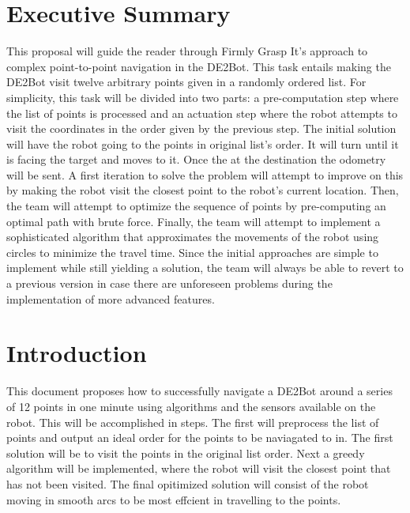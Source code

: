 \documentclass[12pt,conference,onecolumn]{IEEEtran} %
\begin{document}
\section{Executive Summary}
This proposal will guide the reader through Firmly Grasp It's approach to complex point-to-point navigation in the DE2Bot. This task entails making the DE2Bot visit twelve arbitrary points given in a randomly ordered list. For simplicity, this task will be divided into two parts: a pre-computation step where the list of points is processed and an actuation step where the robot attempts to visit the coordinates in the order given by the previous step. The initial solution will have the robot going to the points in original list's order. It will turn until it is facing the target and moves to it. Once the at the destination the odometry will be sent. A first iteration to solve the problem will attempt to improve on this by making the robot visit the closest point to the robot's current location. Then, the team will attempt to optimize the sequence of points by pre-computing an optimal path with brute force. Finally, the team will attempt to implement a sophisticated algorithm that approximates the movements of the robot using circles to minimize the travel time. Since the initial approaches are simple to implement while still yielding a solution, the team will always be able to revert to a previous version in case there are unforeseen problems during the implementation of more advanced features.


\clearpage


\section{Introduction}

This document proposes how to successfully navigate a DE2Bot around a series of 12 points in one minute using algorithms and the sensors available on the robot. This will be accomplished in steps. The first will preprocess the list of points and output an ideal order for the points to be naviagated to in. The first solution will be to visit the points in the original list order. Next a greedy algorithm will be implemented, where the robot will visit the closest point that has not been visited. The final opitimized solution will consist of the robot moving in smooth arcs to be most effcient in travelling to the points.
\end{document}
